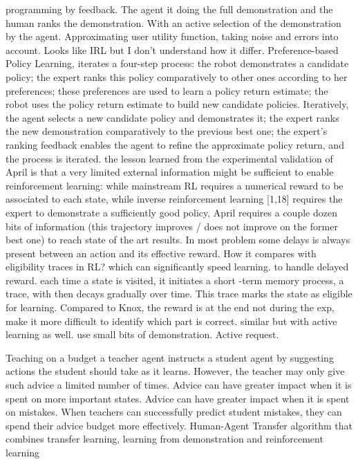 \cite{akrour2014programming} programming by feedback. The agent it doing the full demonstration and the human ranks the demonstration. With an active selection of the demonstration by the agent. Approximating user utility function, taking noise and errors into account. Looks like IRL but I don't understand how it differ. 
\cite{akrour2011preference} Preference-based Policy Learning, iterates a four-step process: the robot demonstrates a candidate policy; the expert ranks this policy comparatively to other ones according to her preferences; these preferences are used to learn a policy return estimate; the robot uses the policy return estimate to build new candidate policies.
\cite{akrour2012april} Iteratively, the agent selects a new candidate policy and demonstrates it; the expert ranks the new demonstration comparatively to the previous best one; the expert's ranking feedback enables the agent to refine the approximate policy return, and the process is iterated. the lesson learned from the experimental validation of April is that a very
limited external information might be sufficient to enable reinforcement learning: while mainstream RL requires a numerical reward to be associated to each state, while inverse reinforcement learning [1,18] requires the expert to demonstrate a sufficiently good policy, April requires a couple dozen bits of information (this trajectory improves / does not improve on the former best one) to reach state of the art results. In most problem some delays is always present between an action and its effective reward. How it compares with eligibility traces \cite{sutton1998reinforcement} in RL? which can significantly speed learning. to handle delayed reward. each time a state is visited, it initiates a short -term memory process, a trace, with then decays gradually over time. This trace marks the state as eligible for learning. Compared to Knox, the reward is at the end not during the exp, make it more difficult to identify which part is correct. \cite{wilson2012bayesian} similar but with active learning as well. use small bits of demonstration. Active request.


\cite{torrey2013teaching} Teaching on a budget
a teacher agent instructs a student agent by suggesting actions the student should take as it learns. However, the teacher may only give such advice a limited number of times.  Advice can have greater impact when it is spent on more
important states. Advice can have greater impact when it is spent on mistakes. When teachers can successfully predict student mistakes, they
can spend their advice budget more effectively.
\cite{taylor2011integrating} Human-Agent Transfer algorithm that combines transfer learning, learning from demonstration and reinforcement learning

